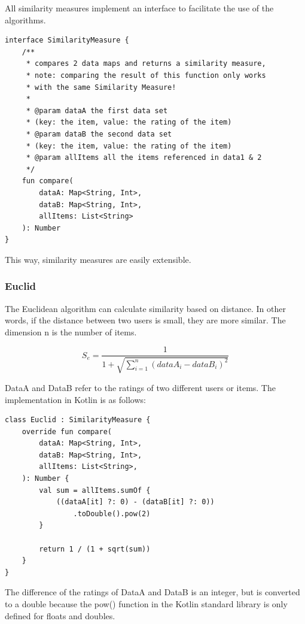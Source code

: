 All similarity measures implement an interface to facilitate the use of the algorithms.

\begin{verbatim}
interface SimilarityMeasure {
    /**
     * compares 2 data maps and returns a similarity measure,
     * note: comparing the result of this function only works 
     * with the same Similarity Measure!
     *
     * @param dataA the first data set
     * (key: the item, value: the rating of the item)
     * @param dataB the second data set
     * (key: the item, value: the rating of the item)
     * @param allItems all the items referenced in data1 & 2
     */
    fun compare(
        dataA: Map<String, Int>,
        dataB: Map<String, Int>,
        allItems: List<String>
    ): Number
}
\end{verbatim}

This way, similarity measures are easily extensible.

\subsubsection{Euclid}

The Euclidean algorithm can calculate similarity based on distance. In other words, if the distance between two users is small, they are more similar. The dimension n is the number of items.

\begin{equation}
S_{e} = \frac{1}{1+\sqrt{\sum_{i=1}^{n}{(dataA_i - dataB_i)^2}}}
\label{euklid}
\end{equation}

DataA and DataB refer to the ratings of two different users or items.
The implementation in Kotlin is as follows:

\begin{verbatim}
class Euclid : SimilarityMeasure {
    override fun compare(
        dataA: Map<String, Int>,
        dataB: Map<String, Int>,
        allItems: List<String>,
    ): Number {
        val sum = allItems.sumOf {
            ((dataA[it] ?: 0) - (dataB[it] ?: 0))
                .toDouble().pow(2)
        }

        return 1 / (1 + sqrt(sum))
    }
}
\end{verbatim}

The difference of the ratings of DataA and DataB is an integer, but is converted to a double because the pow() function in the Kotlin standard library is only defined for floats and doubles.

